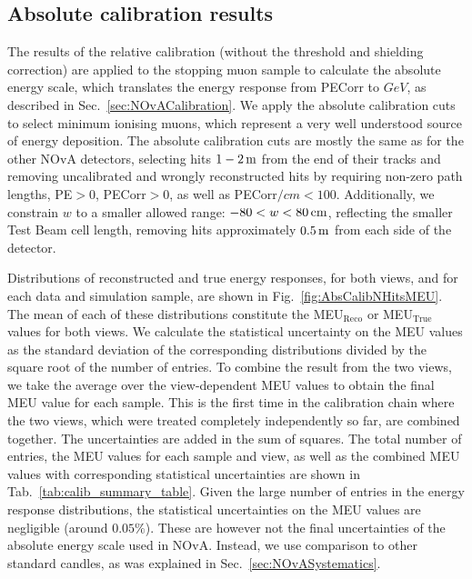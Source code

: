 \FloatBarrier
\subsection{Absolute calibration results}\label{sec:TBAbsoluteCalib}
The results of the relative calibration (without the threshold and shielding correction) are applied to the stopping muon sample to calculate the absolute energy scale,  which translates the energy response from \gls{PECorr} to $\unit{GeV}$, as described in Sec.~\ref{sec:NOvACalibration}. We apply the absolute calibration cuts to select minimum ionising muons, which represent a very well understood source of energy deposition. The absolute calibration cuts are mostly the same as for the other \gls{NOvA} detectors, selecting hits $1-\unit[2]{m}$ from the end of their tracks and removing uncalibrated and wrongly reconstructed hits by requiring non-zero path lengths, \gls{PE}$>0$, \gls{PECorr}$>0$, as well as \gls{PECorr}$\unit{/cm}<100$. Additionally, we constrain $w$ to a smaller allowed range: $-80<w<\unit[80]{cm}$, reflecting the smaller Test Beam cell length, removing hits approximately $\unit[0.5]{m}$ from each side of the detector.

Distributions of reconstructed and true energy responses, for both views, and for each data and simulation sample, are shown in Fig.~\ref{fig:AbsCalibNHitsMEU}. The mean of each of these distributions constitute the \gls{MEU}$_{\mathrm{Reco}}$ or \gls{MEU}$_{\mathrm{True}}$ values for both views. We calculate the statistical uncertainty on the \gls{MEU} values as the standard deviation of the corresponding distributions divided by the square root of the number of entries. To combine the result from the two views, we take the average over the view-dependent \gls{MEU} values to obtain the final \gls{MEU} value for each sample. This is the first time in the calibration chain where the two views, which were treated completely independently so far, are combined together. The uncertainties are added in the sum of squares. The total number of entries, the \gls{MEU} values for each sample and view, as well as the combined \gls{MEU} values with corresponding statistical uncertainties are shown in Tab.~\ref{tab:calib_summary_table}. Given the large number of entries in the energy response distributions, the statistical uncertainties on the \gls{MEU} values are negligible (around $0.05\%$). These are however not the final uncertainties of the absolute energy scale used in \gls{NOvA}. Instead, we use comparison to other standard candles, as was explained in Sec.~\ref{sec:NOvASystematics}.

